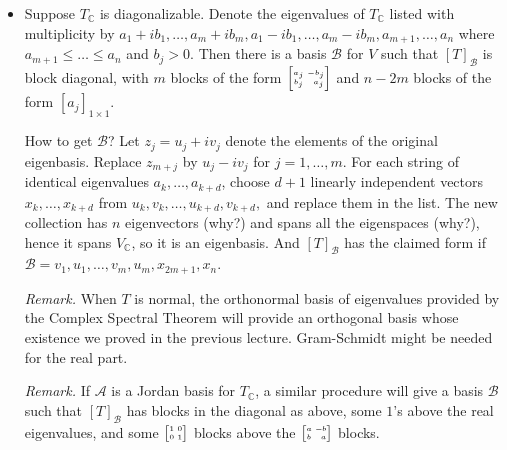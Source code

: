 \documentclass[11pt]{article}
\newcommand{\1}{\mathbf{1}}
\newcommand{\0}{\mathbf{0}}
\newcommand{\A}{\mathcal{A}}
\newcommand{\B}{\mathcal{B}}
\newcommand{\C}{\mathbb{C}}
\DeclareMathOperator{\myspan}{\mathsf{span}}
\newcommand{\abba}{{\tiny \begin{bmatrix} a \ {-\!\!\;b} \\ b \ \ \ a \end{bmatrix}}}
\renewcommand{\leq}{\leqslant}
\begin{document}
{\begin{itemize}
\emph{Proof.}
Since $ u-iv $ is an eigenvector for $ a-ib $, they are linearly independent and $ \myspan\{u\pm iv\} = \myspan\{u,v\} $ is two-dimensional.
Now observe 
that
$ Tu + iTv = T_\C(u+iv) = (a+ib)(u+iv) = (au-bv) + i (bu+av) $,
whence $ Tu=au-bv $ and $ Tv=bu+av $.
Hence $ \myspan\{u,v\} $ is invariant and
$ [T_{|_{\myspan\{u,v\}}}]_{\{v,u\}} = \abba $.

\item

Suppose $ T_\C $ is diagonalizable.
Denote the eigenvalues of $ T_\C $ listed with multiplicity by
$a_1+ib_1,\dots,a_m+ib_m,a_1-ib_1,\dots,a_m-ib_m,a_{m+1},\dots,a_n$ where $ a_{m+1} \leq \dots \leq a_n $ and $ b_j > 0 $.
Then there is a basis $ \B $ for $ V $ such that $ [T]_\B $ is block diagonal, with $ m $ blocks of the form
$ \tiny \begin{bmatrix} a_j \ {-b_j} \\ b_j \ \ \ a_j \end{bmatrix} $
and $ n-2m $ blocks of the form $ [a_j]_{1 \times 1} $.

How to get $ \B $?
Let $ z_j = u_j + iv_j $ denote the elements of the original eigenbasis.
Replace $ z_{m+j} $ by $ u_j - iv_j $ for $ j=1,\dots,m $.
For each string of identical eigenvalues $ a_k,\dots,a_{k+d} $, choose $ d+1 $ linearly independent vectors $ x_k,\dots,x_{k+d} $ from $ u_k,v_k,\dots,u_{k+d},v_{k+d}, $ and replace them in the list.
The new collection has $ n $ eigenvectors (why?) and spans all the eigenspaces (why?), hence it spans $ V_\C $, so it is an eigenbasis.
And $ [T]_\B $ has the claimed form
if $ \B = v_1,u_1,\dots,v_m,u_m,x_{2m+1},x_n $.

\emph{Remark.}
When $ T $ is normal, the orthonormal basis of eigenvalues provided by the Complex Spectral Theorem will provide an orthogonal basis whose existence we proved in the previous lecture.
Gram-Schmidt might be needed for the real part.

\emph{Remark.}
If $ \A $ is a Jordan basis for $ T_\C $, a similar procedure will give a basis $ \B $ such that $ [T]_\B $ has blocks in the diagonal as above, some $ 1 $'s above the real eigenvalues, and some
$ \tiny \begin{bmatrix} 1 \ 0 \\ 0 \ 1 \end{bmatrix} $
blocks above the 
$ \abba $
blocks.

\end{itemize}


}
\end{document}

